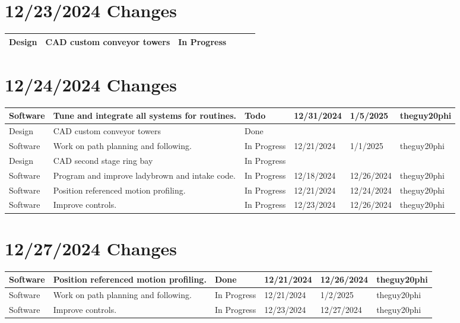 \section{12/23/2024 Changes}
\begin{center}
\begin{longtable}{| p{40pt} | p{150pt} | p{35pt} | p{33pt} | p{33pt} | p{40pt} |}
\hline \rowcolor{LightGoldenrod1}
Design & CAD custom conveyor towers & In Progress &  &  & \\
\hline
\end{longtable}
\end{center}


\section{12/24/2024 Changes}
\begin{center}
\begin{longtable}{| p{40pt} | p{150pt} | p{35pt} | p{33pt} | p{33pt} | p{40pt} |}
\hline \rowcolor{IndianRed1}
Software & Tune and integrate all systems for routines. & Todo & 12/31/2024 & 1/5/2025 & theguy20phi \\
\hline \rowcolor{DarkSeaGreen1}
Design & CAD custom conveyor towers & Done &  &  & \\
\hline \rowcolor{LightGoldenrod1}
Software & Work on path planning and following. & In Progress & 12/21/2024 & 1/1/2025 & theguy20phi \\
\hline \rowcolor{LightGoldenrod1}
Design & CAD second stage ring bay & In Progress &  &  & \\
\hline \rowcolor{LightGoldenrod1}
Software & Program and improve ladybrown and intake code. & In Progress & 12/18/2024 & 12/26/2024 & theguy20phi \\
\hline \rowcolor{LightGoldenrod1}
Software & Position referenced motion profiling. & In Progress & 12/21/2024 & 12/24/2024 & theguy20phi \\
\hline \rowcolor{LightGoldenrod1}
Software & Improve controls. & In Progress & 12/23/2024 & 12/26/2024 & theguy20phi \\
\hline
\end{longtable}
\end{center}


\section{12/27/2024 Changes}
\begin{center}
\begin{longtable}{| p{40pt} | p{150pt} | p{35pt} | p{33pt} | p{33pt} | p{40pt} |}
\hline \rowcolor{DarkSeaGreen1}
Software & Position referenced motion profiling. & Done & 12/21/2024 & 12/26/2024 & theguy20phi \\
\hline \rowcolor{LightGoldenrod1}
Software & Work on path planning and following. & In Progress & 12/21/2024 & 1/2/2025 & theguy20phi \\
\hline \rowcolor{LightGoldenrod1}
Software & Improve controls. & In Progress & 12/23/2024 & 12/27/2024 & theguy20phi \\
\hline
\end{longtable}
\end{center}


